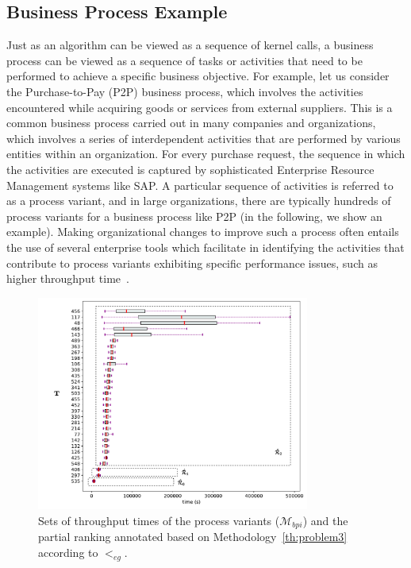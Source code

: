 \documentclass[acmsmall,screen, review]{acmart}
\begin{document}
\subsection{Business Process Example}
\label{sec3:bpi}
Just as an algorithm can be viewed as a sequence of kernel calls, a business process can be viewed as a sequence of tasks or activities that need to be performed to achieve a specific business objective. For example, let us consider the Purchase-to-Pay (P2P)  business process, which involves the activities encountered while acquiring goods or services from external suppliers. This is a common business process carried out in many companies and organizations, which involves a series of interdependent activities that are performed by various entities within an organization. For every purchase request, the sequence in which the activities are executed is captured  by sophisticated Enterprise Resource Management systems like SAP. A particular sequence of activities is referred to as a process variant, and in large organizations, there are typically hundreds of process variants for a business process like P2P (in the following, we show an example). Making organizational changes to improve such a process often entails the use of several enterprise tools which facilitate in identifying the activities that contribute to process variants exhibiting specific performance issues, such as higher throughput time~\cite{van_der_aalst2016process}.

\begin{figure}[h!]
	\centering
	\includegraphics[width=0.8\textwidth]{fig/ch3/bpi-eg}
	\caption{Sets of throughput times of the process variants ($\mathcal{M}_{bpi}$) and the partial ranking annotated based on Methodology~\ref{th:problem3} according to $<_{eg}$.}
	\label{fig3:bpi-eg}
\end{figure}
\end{document}
